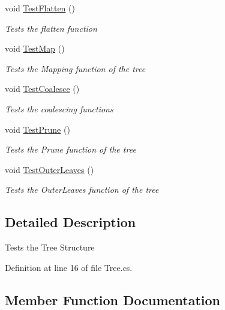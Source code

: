\begin{DoxyCompactItemize}
void \hyperlink{classHumDrumTests_1_1Structures_1_1TreeTest_aeacfccae3125243c05553c6c4fc54994}{Test\+Flatten} ()
\begin{DoxyCompactList}\small\item\em Tests the flatten function \end{DoxyCompactList}\item 
void \hyperlink{classHumDrumTests_1_1Structures_1_1TreeTest_a619d6b8e573ea2d6c2c8701a4341a4dc}{Test\+Map} ()
\begin{DoxyCompactList}\small\item\em Tests the Mapping function of the tree \end{DoxyCompactList}\item 
void \hyperlink{classHumDrumTests_1_1Structures_1_1TreeTest_af8ec14e70454b25f538d18e64217cbf1}{Test\+Coalesce} ()
\begin{DoxyCompactList}\small\item\em Tests the coalescing functions \end{DoxyCompactList}\item 
void \hyperlink{classHumDrumTests_1_1Structures_1_1TreeTest_a2abf28a86409c357a68e658d7071346a}{Test\+Prune} ()
\begin{DoxyCompactList}\small\item\em Tests the Prune function of the tree \end{DoxyCompactList}\item 
void \hyperlink{classHumDrumTests_1_1Structures_1_1TreeTest_a69ab7fcf8d4b5cc7bbcb878e3ed9ca13}{Test\+Outer\+Leaves} ()
\begin{DoxyCompactList}\small\item\em Tests the Outer\+Leaves function of the tree \end{DoxyCompactList}\end{DoxyCompactItemize}


\subsection{Detailed Description}
Tests the Tree Structure 



Definition at line 16 of file Tree.\+cs.



\subsection{Member Function Documentation}
